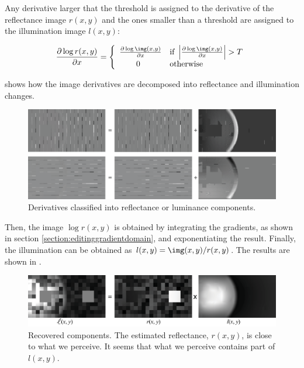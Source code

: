 Any derivative larger that the threshold is assigned to the derivative of the reflectance image $r(x,y)$ and the ones smaller than a threshold are assigned to the illumination image $l(x,y)$:

\begin{equation}
\frac{\partial \log r(x,y)}{ \partial x} =  \left\{
\begin{array}{rl}
\frac{\partial \log \img (x,y)}{ \partial x} & \text{if} ~  \left| \frac{\partial \log \img (x,y)}{ \partial x} \right|>T\\
0 ~~~~~~~~& \text{otherwise}
\end{array} \right.
\end{equation}

\Fig{\ref{fig:simultaneous2}} shows how the image derivatives are decomposed into reflectance and illumination changes.

\begin{figure}[h]
\centerline{
\includegraphics[width=1\linewidth]{figures/statistical_image_models/retinex_solution_b.eps}
} 
\caption{Derivatives classified into reflectance or luminance components.} 
\label{fig:simultaneous2}
\end{figure}

 Then, the image $\log r(x,y)$ is obtained by integrating the gradients, as shown in section \ref{section:editinggradientdomain}, and exponentiating the result. Finally, the illumination can be obtained as $l(x,y) = \img(x,y)/r(x,y)$. The results are shown in \fig{\ref{fig:simultaneous3}}.

\begin{figure}[h]
\centerline{
\includegraphics[width=1\linewidth]{figures/statistical_image_models/retinex_solution_a.eps}
} 
\caption{Recovered components. The estimated reflectance, $r(x,y)$, is close to what we perceive. It seems that what we perceive contains part of $l(x,y)$.} 
\label{fig:simultaneous3}
\end{figure}


